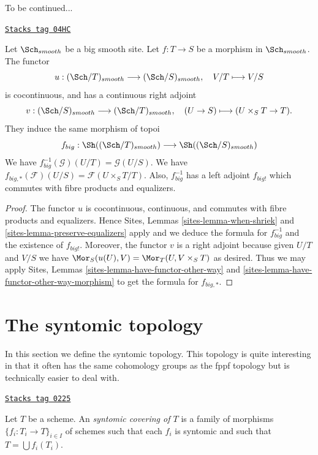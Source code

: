 To be continued...

\begin{lemma}
\label{topologies-lemma-morphism-big-smooth}
\href{https://stacks.math.columbia.edu/tag/04HC}{\texttt{Stacks tag 04HC}}

Let $\Sch_{smooth}$ be a big smooth site.
Let $f : T \to S$ be a morphism in $\Sch_{smooth}$.
The functor
$$
u : (\Sch/T)_{smooth} \longrightarrow (\Sch/S)_{smooth},
\quad
V/T \longmapsto V/S
$$
is cocontinuous, and has a continuous right adjoint
$$
v : (\Sch/S)_{smooth} \longrightarrow (\Sch/T)_{smooth},
\quad
(U \to S) \longmapsto (U \times_S T \to T).
$$
They induce the same morphism of topoi
$$
f_{big} :
\Sh((\Sch/T)_{smooth})
\longrightarrow
\Sh((\Sch/S)_{smooth})
$$
We have $f_{big}^{-1}(\mathcal{G})(U/T) = \mathcal{G}(U/S)$.
We have $f_{big, *}(\mathcal{F})(U/S) = \mathcal{F}(U \times_S T/T)$.
Also, $f_{big}^{-1}$ has a left adjoint $f_{big!}$ which commutes with
fibre products and equalizers.
\end{lemma}

\begin{proof}
The functor $u$ is cocontinuous, continuous, and commutes with fibre products
and equalizers. Hence
Sites, Lemmas \ref{sites-lemma-when-shriek} and
\ref{sites-lemma-preserve-equalizers}
apply and we deduce the formula
for $f_{big}^{-1}$ and the existence of $f_{big!}$. Moreover,
the functor $v$ is a right adjoint because given $U/T$ and $V/S$
we have $\Mor_S(u(U), V) = \Mor_T(U, V \times_S T)$
as desired. Thus we may apply
Sites, Lemmas \ref{sites-lemma-have-functor-other-way} and
\ref{sites-lemma-have-functor-other-way-morphism} to get the
formula for $f_{big, *}$.
\end{proof}

\section{The syntomic topology}
\label{topologies-section-syntomic}
In this section we define the syntomic topology.
This topology is quite interesting in that it often
has the same cohomology groups as the fppf topology
but is technically easier to deal with.

\begin{definition}
\label{topologies-definition-syntomic-covering}
\href{https://stacks.math.columbia.edu/tag/0225}{\texttt{Stacks tag 0225}}

Let $T$ be a scheme. An {\it syntomic covering of $T$} is a family
of morphisms $\{f_i : T_i \to T\}_{i \in I}$ of schemes
such that each $f_i$ is syntomic and such
that $T = \bigcup f_i(T_i)$.
\end{definition}

